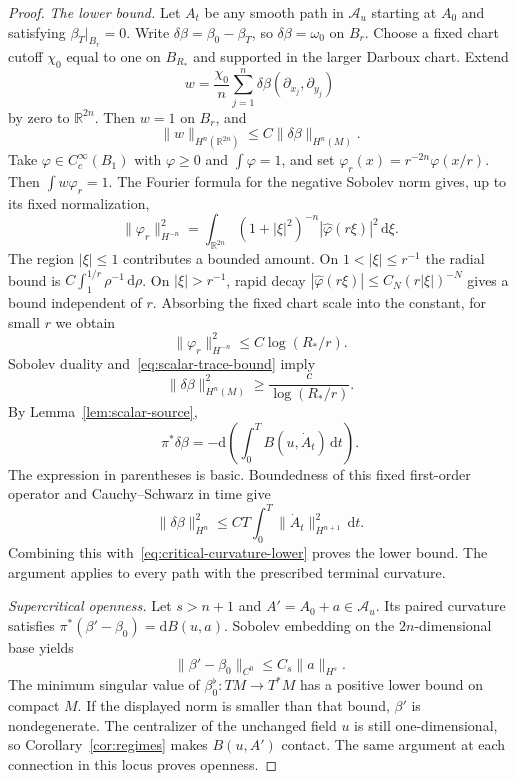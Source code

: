 \documentclass[11pt,a4paper]{article}
\numberwithin{equation}{section}
\theoremstyle{definition}
\theoremstyle{remark}
\newcommand{\R}{\mathbb R}
\newcommand{\dd}{\mathrm d}
\begin{document}
\begin{proof}
\smallskip\noindent
\emph{The lower bound.}
Let $A_t$ be any smooth path in $\mathcal A_u$ starting at $A_0$ and
satisfying $\beta_T|_{B_r}=0$. Write
$\delta\beta=\beta_0-\beta_T$, so $\delta\beta=\omega_0$ on $B_r$.
Choose a fixed chart cutoff $\chi_0$ equal to one on $B_{R_*}$ and supported
in the larger Darboux chart. Extend
\[
 w=\frac{\chi_0}{n}\sum_{j=1}^n
                  \delta\beta(\partial_{x_j},\partial_{y_j})
\]
by zero to $\R^{2n}$. Then $w=1$ on $B_r$, and
\begin{equation}\label{eq:scalar-trace-bound}
 \|w\|_{H^n(\R^{2n})}\leq C\|\delta\beta\|_{H^n(M)}.
\end{equation}
Take $\varphi\in C_c^\infty(B_1)$ with $\varphi\geq0$ and
$\int\varphi=1$, and set
$\varphi_r(x)=r^{-2n}\varphi(x/r)$. Then $\int w\varphi_r=1$.
The Fourier formula for the negative Sobolev norm gives, up to its fixed
normalization,
\[
 \|\varphi_r\|_{H^{-n}}^2
 =\int_{\R^{2n}}(1+|\xi|^2)^{-n}
                         |\widehat\varphi(r\xi)|^2\,\dd\xi.
\]
The region $|\xi|\leq1$ contributes a bounded amount. On
$1<|\xi|\leq r^{-1}$ the radial bound is
$C\int_1^{1/r}\rho^{-1}\,\dd\rho$. On $|\xi|>r^{-1}$, rapid decay
$|\widehat\varphi(r\xi)|\leq C_N(r|\xi|)^{-N}$ gives a bound independent
of $r$. Absorbing the fixed chart scale into the constant, for small $r$ we
obtain
\begin{equation}\label{eq:critical-dual-bump}
 \|\varphi_r\|_{H^{-n}}^2\leq C\log(R_*/r).
\end{equation}
Sobolev duality and~\eqref{eq:scalar-trace-bound} imply
\begin{equation}\label{eq:critical-curvature-lower}
 \|\delta\beta\|_{H^n(M)}^2\geq\frac{c}{\log(R_*/r)}.
\end{equation}
By Lemma~\ref{lem:scalar-source},
\[
 \pi^*\delta\beta
 =-\dd\!\left(\int_0^T B(u,\dot A_t)\,\dd t\right).
\]
The expression in parentheses is basic. Boundedness of this fixed
first-order operator and Cauchy--Schwarz in time give
\[
 \|\delta\beta\|_{H^n}^2
 \leq CT\int_0^T\|\dot A_t\|_{H^{n+1}}^2\,\dd t.
\]
Combining this with~\eqref{eq:critical-curvature-lower} proves the lower
bound. The argument applies to every path with the prescribed terminal curvature.

\smallskip\noindent
\emph{Supercritical openness.}
Let $s>n+1$ and $A'=A_0+a\in\mathcal A_u$. Its paired curvature satisfies
$\pi^*(\beta'-\beta_0)=\dd B(u,a)$. Sobolev embedding on the
$2n$-dimensional base yields
\[
 \|\beta'-\beta_0\|_{C^0}\leq C_s\|a\|_{H^s}.
\]
The minimum singular value of
$\beta_0^\flat:TM\to T^*M$ has a positive lower bound on compact $M$.
If the displayed norm is smaller than that bound, $\beta'$ is nondegenerate.
The centralizer of the unchanged field $u$ is still one-dimensional, so
Corollary~\ref{cor:regimes} makes $B(u,A')$ contact. The same argument at
each connection in this locus proves openness.
\end{proof}
\end{document}
